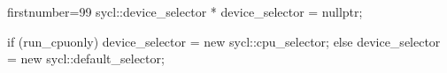 \begin{cppcode*}{firstnumber=99}
        sycl::device_selector * device_selector = nullptr;

        if (run_cpuonly) {
            device_selector = new sycl::cpu_selector{};
        } else {
            device_selector = new sycl::default_selector{};
        }
\end{cppcode*}
